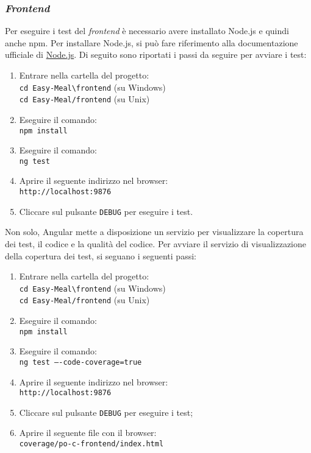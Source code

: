 \subsubsection{\textit{Frontend}} 
Per eseguire i test del \textit{frontend} è necessario avere installato Node.js 
e quindi anche npm. Per installare Node.js, si può fare riferimento alla
documentazione ufficiale di \href{https://nodejs.org/en/download/package-manager}{Node.js}. 
Di seguito sono riportati i passi da seguire per avviare i test:
\begin{enumerate}
	\item Entrare nella cartella del progetto: \\
		\texttt{cd Easy-Meal\textbackslash frontend} (su Windows) \\
		\texttt{cd Easy-Meal/frontend} (su Unix)
	\item Eseguire il comando: \\
		\texttt{npm install}
	\item Eseguire il comando: \\
		\texttt{ng test}
	\item Aprire il seguente indirizzo nel browser: \\
		\texttt{http://localhost:9876}
	\item Cliccare sul pulsante \texttt{DEBUG} per eseguire i test.
\end{enumerate}

Non solo, Angular mette a disposizione un servizio per visualizzare la copertura
dei test, il codice e la qualità del codice. Per avviare il servizio di
visualizzazione della copertura dei test, si seguano i seguenti passi:
\begin{enumerate}
	\item Entrare nella cartella del progetto: \\
		\texttt{cd Easy-Meal\textbackslash frontend} (su Windows) \\
		\texttt{cd Easy-Meal/frontend} (su Unix)
	\item Eseguire il comando: \\
		\texttt{npm install}
	\item Eseguire il comando: \\
		\texttt{ng test ----code-coverage=true}
	\item Aprire il seguente indirizzo nel browser: \\
		\texttt{http://localhost:9876}
	\item Cliccare sul pulsante \texttt{DEBUG} per eseguire i test;
	\item Aprire il seguente file con il browser: \\
		\texttt{coverage/po-c-frontend/index.html}
\end{enumerate}


